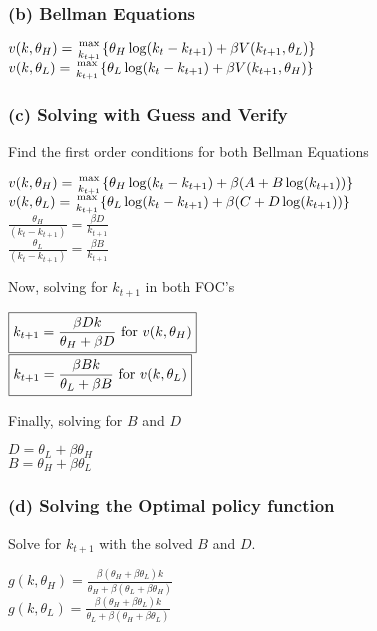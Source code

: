 \documentclass[10pt, a4paper]{article}
\begin{document}
    \subsubsection*{(b) Bellman Equations}
    \begin{center}
      $v(k,\theta_H) = {\max\atop{k_{t+1}}}\{\theta_{H}\log(k_t-k_{t+1})+\beta V(k_{t+1},\theta_L)\}$ \\
      $v(k,\theta_L) = {\max\atop{k_{t+1}}}\{\theta_{L}\log(k_t-k_{t+1})+\beta V(k_{t+1},\theta_H)\}$ \\
    \end{center}
    \subsubsection*{(c) Solving with Guess and Verify}
    Find the first order conditions for both Bellman Equations
    \begin{center}
      $v(k,\theta_H) = {\max\atop{k_{t+1}}}\{\theta_H\log(k_t-k_{t+1})+\beta(A+B\log(k_{t+1}))\}$ \\
      $v(k,\theta_L) = {\max\atop{k_{t+1}}}\{\theta_L\log(k_t-k_{t+1})+\beta(C+D\log(k_{t+1}))\}$ \\
      $\boxed{\frac{\theta_H}{(k_t-k_{t+1})}=\frac{\beta D}{k_{t+1}}}$ \\
      $\boxed{\frac{\theta_L}{(k_t-k_{t+1})}=\frac{\beta B}{k_{t+1}}}$
    \end{center}
    Now, solving for $k_{t+1}$ in both FOC's
    \begin{center}
      $\boxed{k_{t+1} = \frac{\beta Dk}{\theta_H+\beta D}$ for $v(k,\theta_H)}$\\
      $\boxed{k_{t+1} = \frac{\beta Bk}{\theta_L+\beta B}$ for $v(k,\theta_L)}$ \\
    \end{center}
    Finally, solving for $B$ and $D$
    \begin{center}
      $\boxed{D = \theta_L + \beta\theta_H}$\\
      $\boxed{B = \theta_H+\beta\theta_L}$
    \end{center}
    \subsubsection*{(d) Solving the Optimal policy function}
    Solve for $k_{t+1}$ with the solved $B$ and $D$.
    \begin{center}
      $g(k,\theta_H) = \frac{\beta(\theta_H+\beta\theta_L)k}{\theta_H+\beta(\theta_L+\beta\theta_H)}$ \\
      $g(k,\theta_L) = \frac{\beta(\theta_H+\beta\theta_L)k}{\theta_L+\beta(\theta_H+\beta\theta_L)}$
    \end{center}
\end{document}
